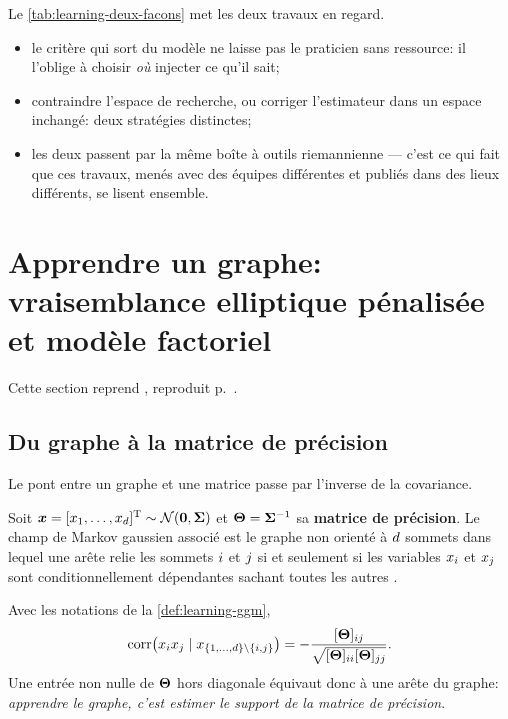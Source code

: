 Le \cref{tab:learning-deux-facons} met les deux travaux en regard.
\begin{itemize}
  \item le critère qui sort du modèle ne laisse pas le praticien sans
    ressource: il l'oblige à choisir \emph{où} injecter ce qu'il sait;
  \item contraindre l'espace de recherche, ou corriger l'estimateur dans un
    espace inchangé: deux stratégies distinctes;
  \item les deux passent par la même boîte à outils riemannienne --- c'est ce
    qui fait que ces travaux, menés avec des équipes différentes et publiés
    dans des lieux différents, se lisent ensemble.
\end{itemize}

\section{Apprendre un graphe: vraisemblance elliptique pénalisée et modèle factoriel}
\label{sec:learning-graphes}

\begin{contributions}
  Cette section reprend , reproduit p.~.
\end{contributions}

\subsection{Du graphe à la matrice de précision}
\label{subsec:learning-graphe-precision}

Le pont entre un graphe et une matrice passe par l'inverse de la covariance.

\begin{definition}
\label{def:learning-ggm}
  Soit $\boldsymbol{x}=[x_1,\dots,x_{d}]^{\mathrm{T}}\sim\mathcal{N}(\boldsymbol{0},\boldsymbol{\Sigma})$ et
  $\boldsymbol{\Theta}={\boldsymbol{\Sigma}}^{-1}$ sa \textbf{matrice de précision}. Le champ de Markov
  gaussien associé est le graphe non orienté à $d$ sommets dans lequel une
  arête relie les sommets $i$ et $j$ si et seulement si les
  variables $x_i$ et $x_j$ sont conditionnellement dépendantes
  sachant toutes les autres .
\end{definition}

\begin{property}
\label{prop:learning-support}
  Avec les notations de la \cref{def:learning-ggm},
  \begin{equation}
    \mathrm{corr}\!\left(x_i x_j \mid x_{\{1,\dots,d\}\setminus\{i,j\}}\right)
    =
    -\frac{[\boldsymbol{\Theta}]_{ij}}{\sqrt{[\boldsymbol{\Theta}]_{ii}[\boldsymbol{\Theta}]_{jj}}} .
    \label{eq:learning-corr-partielle}
  \end{equation}
  Une entrée non nulle de $\boldsymbol{\Theta}$ hors diagonale équivaut donc à une arête
  du graphe: \emph{apprendre le graphe, c'est estimer le support de la matrice
  de précision}.
\end{property}

